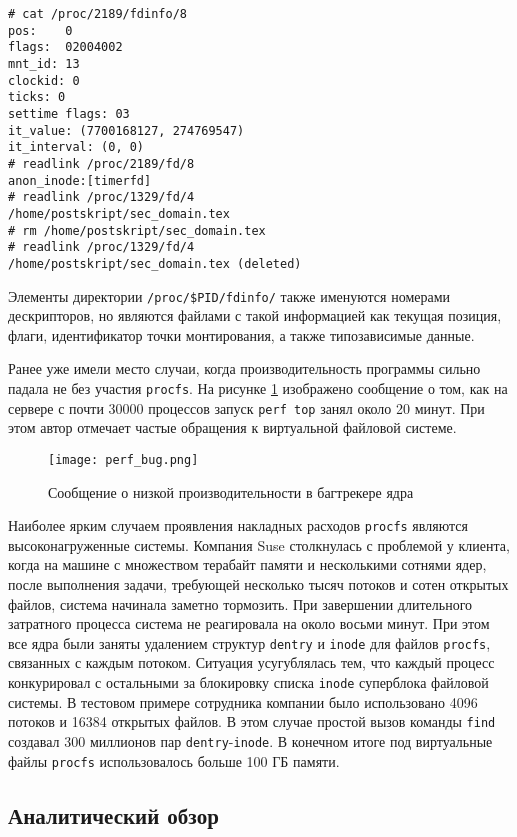 \medskip
\begin{lstlisting}[style=cstyle]
# cat /proc/2189/fdinfo/8
pos:    0
flags:  02004002
mnt_id: 13
clockid: 0
ticks: 0
settime flags: 03
it_value: (7700168127, 274769547)
it_interval: (0, 0)
# readlink /proc/2189/fd/8
anon_inode:[timerfd]
# readlink /proc/1329/fd/4
/home/postskript/sec_domain.tex
# rm /home/postskript/sec_domain.tex
# readlink /proc/1329/fd/4
/home/postskript/sec_domain.tex (deleted)
\end{lstlisting}
\medskip

Элементы директории \texttt{/proc/\$PID/fdinfo/} также именуются номерами
дескрипторов, но являются файлами с такой информацией как текущая позиция,
флаги, идентификатор точки монтирования, а также типозависимые данные.

Ранее уже имели место случаи, когда производительность программы сильно падала
не без участия \texttt{procfs}\cite{slowperf}. На рисунке \ref{fig:perf_bug}
изображено сообщение о том, как на сервере с почти 30000 процессов запуск
\texttt{perf top} занял около 20 минут. При этом автор отмечает частые обращения
к виртуальной файловой системе.

\begin{figure}
  \centering
  \texttt{[image: perf\_bug.png]}
  \caption{Сообщение о низкой производительности в багтрекере ядра \cite{slowperf}}
  \label{fig:perf_bug}
\end{figure}

Наиболее ярким случаем проявления накладных расходов \texttt{procfs} являются
высоконагруженные системы. Компания Suse столкнулась с проблемой у клиента,
когда на машине с множеством терабайт памяти и несколькими сотнями ядер, после
выполнения задачи, требующей несколько тысяч потоков и сотен открытых файлов,
система начинала заметно тормозить\cite{huge_proc_suse}. При завершении
длительного затратного процесса система не реагировала на около восьми минут.
При этом все ядра были заняты удалением структур \texttt{dentry} и
\texttt{inode} для файлов \texttt{procfs}, связанных с каждым потоком. Ситуация
усугублялась тем, что каждый процесс конкурировал с остальными за блокировку
списка \texttt{inode} суперблока файловой системы. В тестовом примере сотрудника
компании было использовано 4096 потоков и 16384 открытых файлов. В этом случае
простой вызов команды \texttt{find} создавал 300 миллионов пар
\texttt{dentry}-\texttt{inode}. В конечном итоге под виртуальные файлы
\texttt{procfs} использовалось больше 100 ГБ памяти.

\subsection{Аналитический обзор}
\label{sub:domain:analitic_overview}

